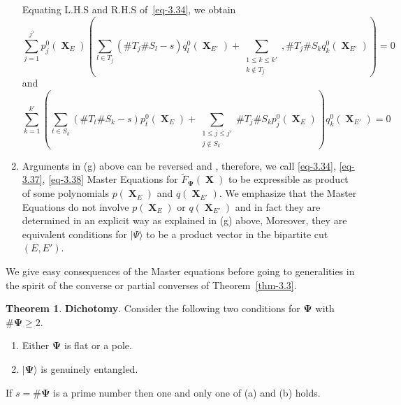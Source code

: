 \documentclass[a4paper,12pt]{article}
\DeclareMathOperator{\x}{\mathrm{X}}
\theoremstyle{definition}
\theoremstyle{underlinethm}
\newtheorem{thm}{Theorem}[section]
\theoremstyle{definition}
\begin{document}
\begin{enumerate}[label=(\alph*)]
Equating L.H.S  and R.H.S of~\eqref{eq-3.34}, we obtain
\begin{equation}
\sum_{j=1}^{j'} p_{j}^{0}(\boldsymbol{\x}_{E}) \left(\sum_{l\in T_{j}} (\# T_{j} \# S_{l} -s) q_{l}^{0}(\boldsymbol{\x}_{E'}) + \sum_{\substack{1 \leq k \leq k' \\ k \notin T_{j}}}, \# T_{j} \# S_{k} q_{k}^{0} (\boldsymbol{\x}_{E'}) \right) = 0 \tag{3.37}\label{eq-3.37}
\end{equation}
and
\begin{equation}
\sum_{k=1}^{k'} \left(\sum_{t \in S_{k}} (\# T_{t} \# S_{k} -s) p_{t}^{0}(\boldsymbol{\x}_{E}) +  \sum_{\substack{1 \leq j \leq j' \\ j \notin S_{k}}} \# T_{j} \# S_{k}  p_{j}^{0}(\boldsymbol{\x}_{E})\right) q_{k}^{0}(\boldsymbol{\x}_{E'}) = 0\tag{3.38}\label{eq-3.38}
\end{equation}

\item Arguments in (g) above can be reversed and , therefore, we call \eqref{eq-3.34}, \eqref{eq-3.37}, \eqref{eq-3.38} Master Equations for $\widetilde{F}_{\boldsymbol{\Psi}}(\boldsymbol{\x})$ to be expressible as product of some polynomials $p(\boldsymbol{\x}_{E})$ and $q(\boldsymbol{\x}_{E'})$. We emphasize that the Master Equations do not involve $p(\boldsymbol{\x}_{E})$ or $q(\boldsymbol{\x}_{E'})$ and in  fact they are determined in an explicit way as explained in (g) above, Moreover, they are equivalent conditions for $| \Psi \rangle$ to be a product vector in the bipartite cut $(E, E')$.
\end{enumerate}


We give easy consequences of the Master equations before going to generalities in the spirit of the converse or partial converses of Theorem~\eqref{thm-3.3}.

\begin{thm}\label{thm-3.4}
\textbf{Dichotomy}. Consider the following two conditions for $\boldsymbol{\Psi}$ with $\# \boldsymbol{\Psi} \geq 2$.
\begin{enumerate}[label=(\alph*)]

\item Either $\boldsymbol{\Psi}$ is flat or a pole.

\item $| \boldsymbol{\Psi} \rangle$ is genuinely entangled.

\end{enumerate}

If $s=\# \boldsymbol{\Psi}$ is a prime number then one and only one of (a) and (b) holds.

\end{thm}
\end{document}
